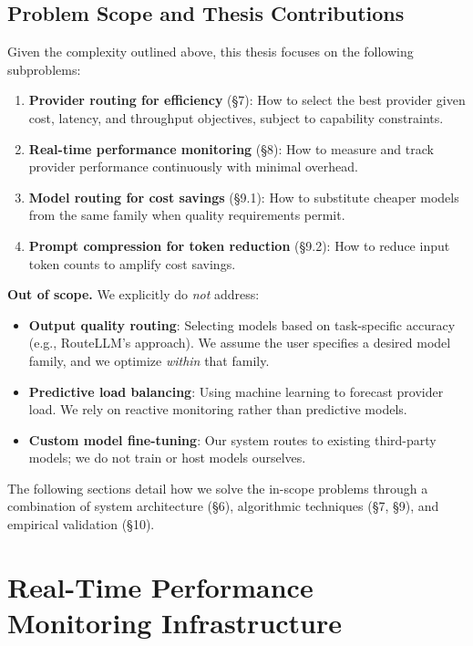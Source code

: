 \documentclass[english]{article}
\begin{document}
\subsection{Problem Scope and Thesis Contributions}

Given the complexity outlined above, this thesis focuses on the following subproblems:

\begin{enumerate}
\item \textbf{Provider routing for efficiency} (§7): How to select the best provider given cost, latency, and throughput objectives, subject to capability constraints.

\item \textbf{Real-time performance monitoring} (§8): How to measure and track provider performance continuously with minimal overhead.

\item \textbf{Model routing for cost savings} (§9.1): How to substitute cheaper models from the same family when quality requirements permit.

\item \textbf{Prompt compression for token reduction} (§9.2): How to reduce input token counts to amplify cost savings.
\end{enumerate}

\medskip

\noindent\textbf{Out of scope.}
We explicitly do \emph{not} address:
\begin{itemize}
    \item \textbf{Output quality routing}: Selecting models based on task-specific accuracy (e.g., RouteLLM's approach). We assume the user specifies a desired model family, and we optimize \emph{within} that family.
    \item \textbf{Predictive load balancing}: Using machine learning to forecast provider load. We rely on reactive monitoring rather than predictive models.
    \item \textbf{Custom model fine-tuning}: Our system routes to existing third-party models; we do not train or host models ourselves.
\end{itemize}

The following sections detail how we solve the in-scope problems through a combination of system architecture (§6), algorithmic techniques (§7, §9), and empirical validation (§10).


\newpage
\section{Real-Time Performance Monitoring Infrastructure}
\end{document}

